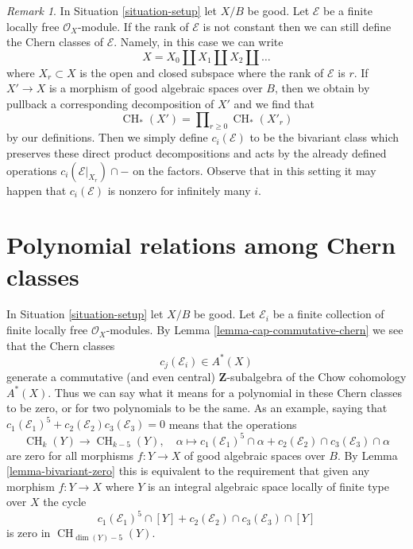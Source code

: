 \documentclass{stacks-project}
\theoremstyle{plain}
\theoremstyle{definition}
\theoremstyle{remark}
\newtheorem{remark}[subsection]{Remark}
\numberwithin{equation}{subsection}
\def\CH{\mathop{\mathrm{CH}}\nolimits}
\begin{document}
\begin{remark}
\label{remark-extend-to-finite-locally-free}
In Situation \ref{situation-setup} let $X/B$ be good.
Let $\mathcal{E}$ be a finite locally free $\mathcal{O}_X$-module.
If the rank of $\mathcal{E}$ is not constant then we can
still define the Chern classes of $\mathcal{E}$. Namely, in this
case we can write
$$
X = X_0 \amalg X_1 \amalg X_2 \amalg \ldots
$$
where $X_r \subset X$ is the open and closed subspace where
the rank of $\mathcal{E}$ is $r$. If $X' \to X$ is a morphism
of good algebraic spaces over $B$, then we obtain by
pullback a corresponding decomposition of $X'$ and we find that
$$
\CH_*(X') = \prod\nolimits_{r \geq 0} \CH_*(X'_r)
$$
by our definitions. Then we simply define $c_i(\mathcal{E})$
to be the bivariant class which preserves these direct
product decompositions and acts by the already defined
operations $c_i(\mathcal{E}|_{X_r}) \cap -$
on the factors. Observe that in this setting it may happen
that $c_i(\mathcal{E})$ is nonzero for infinitely many $i$.
\end{remark}












\section{Polynomial relations among Chern classes}
\label{section-relations-chern-classes}

\noindent
In Situation \ref{situation-setup} let $X/B$ be good.
Let $\mathcal{E}_i$ be a finite collection of finite locally
free $\mathcal{O}_X$-modules. By Lemma \ref{lemma-cap-commutative-chern}
we see that the Chern classes
$$
c_j(\mathcal{E}_i) \in A^*(X)
$$
generate a commutative (and even central) $\mathbf{Z}$-subalgebra of the
Chow cohomology $A^*(X)$.
Thus we can say what it means for a polynomial in these Chern classes
to be zero, or for two polynomials to be the same. As an example, saying that
$c_1(\mathcal{E}_1)^5 + c_2(\mathcal{E}_2)c_3(\mathcal{E}_3) = 0$
means that the operations
$$
\CH_k(Y) \longrightarrow \CH_{k - 5}(Y), \quad
\alpha \longmapsto
c_1(\mathcal{E}_1)^5 \cap \alpha +
c_2(\mathcal{E}_2) \cap c_3(\mathcal{E}_3) \cap \alpha
$$
are zero for all morphisms $f : Y \to X$ of good algebraic spaces over $B$.
By Lemma \ref{lemma-bivariant-zero}
this is equivalent to the requirement that given any morphism
$f : Y \to X$ where $Y$ is an integral algebraic space
locally of finite type over $X$ the cycle
$$
c_1(\mathcal{E}_1)^5 \cap [Y] +
c_2(\mathcal{E}_2) \cap c_3(\mathcal{E}_3) \cap [Y]
$$
is zero in $\CH_{\dim(Y) - 5}(Y)$.
\end{document}
